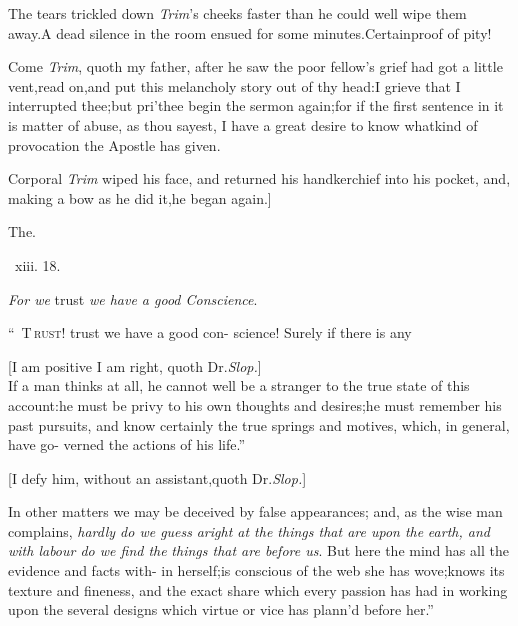 \documentclass{article}
\begin{document}
\tsh The tears trickled down \textit{Trim}’s cheeks faster
than he could well wipe them away.\tsk A dead silence in the room
ensued for some minutes.\tsh Certain\break proof of pity!

Come \textit{Trim}, quoth my father, after he saw the poor
fellow’s grief had got a little vent,\tsk read
on,\tsk and put this melancholy story out of thy head:\tsk I
grieve that I interrupted thee;\tsk but pri’thee begin the sermon
again;\tsk for if the first sentence in it is matter of abuse, as
thou sayest, I have a great desire to know what\break kind of provocation
the Apostle has given.

Corporal \textit{Trim} wiped his face, and returned his
handkerchief into his pocket, and, making a bow as he did
it,\tsk he began again.]

\bigskip
\centerline{The\quad {}.}
\bigskip
\centerline{\, xiii. 18.}
\tsh \textit{For we} trust \textit{we have a good
Conscience}.\tsh

\lettrine{\lower-12pt\hbox{\normalsize “
}T}{\,rust!} trust we have a good con-\break
science! Surely if there is any\break
{}

[I am positive I am right, quoth Dr.\@ \textit{Slop.}]\\
\newpage
\lqq If a man thinks at all, he cannot\break
\lqq well be a stranger to the true state of\break
\lqq this account:\tsk he must be privy to\break
\lqq his own thoughts and desires;\tsh he\break
\lqq must remember his past pursuits, and\break
\lqq know certainly the true springs and\break
\lqq motives, which, in general, have go-\break
\lqq verned the actions of his life.”

[I defy him, without an assistant,\break quoth Dr.\@ \textit{Slop.}]

\indent\lqq In other matters we may be deceived\break
\lqq by false appearances; and, as the wise\break
\lqq man complains, \textit{hardly do we guess}\break
\lqq\textit{aright at the things that are upon the}\break
\lqq\textit{earth, and with labour do we find the}\break
\lqq\textit{things that are before us}. But here the\break
\lqq mind has all the evidence and facts with-\break
\lqq in herself;\tsk is conscious of the web\break
\lqq she has wove;\tsk knows its texture and
\lqq fineness, and the exact share which \break
\lqq every passion has had in working upon\break
\lqq the several designs which virtue or vice\break
\lqq has plann’d before her.”
\end{document}
